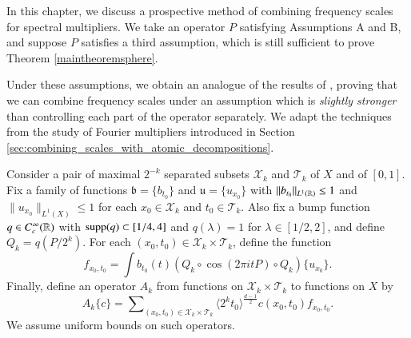 
In this chapter, we discuss a prospective method of combining frequency scales for spectral multipliers. We take an operator $P$ satisfying Assumptions A and B, and suppose $P$ satisfies a third assumption, which is still sufficient to prove Theorem \ref{maintheoremsphere}.

\vspace{0.5em}
\noindent {}
\vspace{0.4em}

 Under these assumptions, we obtain an analogue of the results of \cite{HeoandNazarovandSeeger2}, proving that we can combine frequency scales under an assumption which is \emph{slightly stronger} than controlling each part of the operator separately. We adapt the techniques from the study of Fourier multipliers introduced in Section \ref{sec:combining_scales_with_atomic_decompositions}.

Consider a pair of maximal $2^{-k}$ separated subsets $\mathcal{X}_k$ and $\mathcal{T}_k$ of $X$ and of $[0,1]$. Fix a family of functions $\mathfrak{b} = \{ b_{t_0} \}$ and $\mathfrak{u} = \{ u_{x_0} \}$ with $\| b_{t_0} \|_{L^1(\operatorname{\mathbb{R}})} \leq 1$ and $\| u_{x_0} \|_{L^1(X)} \leq 1$ for each $x_0 \in \mathcal{X}_k$ and $t_0 \in \mathcal{T}_k$. Also fix a bump function $q \in C_c^\infty(\operatorname{\mathbb{R}})$ with $\operatorname{\text{supp}}(q) \subset [1/4,4]$ and $q(\lambda) = 1$ for $\lambda \in [1/2,2]$, and define $Q_k = q(P/2^k)$. For each $(x_0,t_0) \in \mathcal{X}_k \times \mathcal{T}_k$, define the function
%
\[ f_{x_0,t_0} = \int b_{t_0}(t) (Q_k \circ \cos(2 \pi i t P) \circ Q_k) \{ u_{x_0} \}. \]
%
Finally, define an operator $A_k$ from functions on $\mathcal{X}_k \times \mathcal{T}_k$ to functions on $X$ by
%
\[ A_k \{ c \} = \sum\nolimits_{(x_0,t_0) \in \mathcal{X}_k \times \mathcal{T}_k} \langle 2^k t_0 \rangle^{\frac{d-1}{2}} c(x_0,t_0) f_{x_0,t_0}. \]
%
We assume uniform bounds on such operators.\\

\noindent {}\\

